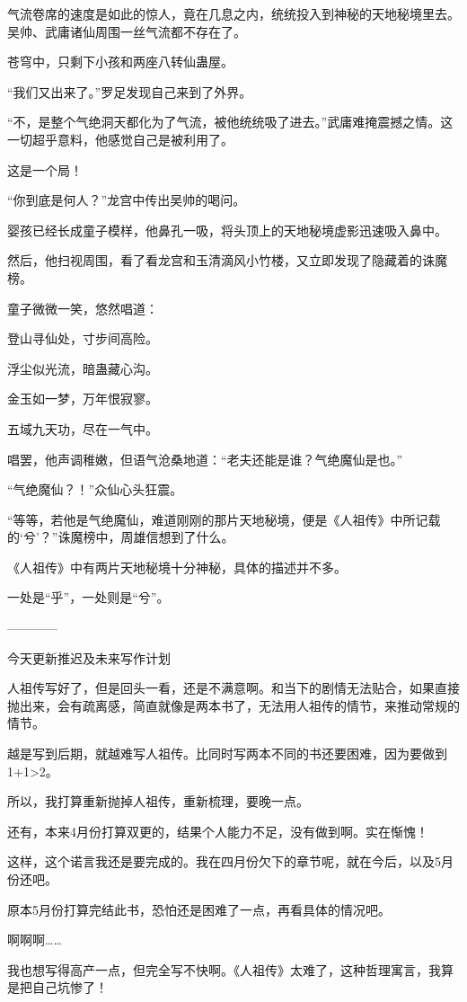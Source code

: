 \begin{this_body}
气流卷席的速度是如此的惊人，竟在几息之内，统统投入到神秘的天地秘境里去。吴帅、武庸诸仙周围一丝气流都不存在了。

苍穹中，只剩下小孩和两座八转仙蛊屋。

“我们又出来了。”罗足发现自己来到了外界。

“不，是整个气绝洞天都化为了气流，被他统统吸了进去。”武庸难掩震撼之情。这一切超乎意料，他感觉自己是被利用了。

这是一个局！

“你到底是何人？”龙宫中传出吴帅的喝问。

婴孩已经长成童子模样，他鼻孔一吸，将头顶上的天地秘境虚影迅速吸入鼻中。

然后，他扫视周围，看了看龙宫和玉清滴风小竹楼，又立即发现了隐藏着的诛魔榜。

童子微微一笑，悠然唱道：

登山寻仙处，寸步间高险。

浮尘似光流，暗蛊藏心沟。

金玉如一梦，万年恨寂寥。

五域九天功，尽在一气中。

唱罢，他声调稚嫩，但语气沧桑地道：“老夫还能是谁？气绝魔仙是也。”

“气绝魔仙？！”众仙心头狂震。

“等等，若他是气绝魔仙，难道刚刚的那片天地秘境，便是《人祖传》中所记载的‘兮’？”诛魔榜中，周雄信想到了什么。

《人祖传》中有两片天地秘境十分神秘，具体的描述并不多。

一处是“乎”，一处则是“兮”。

------------

今天更新推迟及未来写作计划

人祖传写好了，但是回头一看，还是不满意啊。和当下的剧情无法贴合，如果直接抛出来，会有疏离感，简直就像是两本书了，无法用人祖传的情节，来推动常规的情节。

越是写到后期，就越难写人祖传。比同时写两本不同的书还要困难，因为要做到1+1>2。

所以，我打算重新抛掉人祖传，重新梳理，要晚一点。

还有，本来4月份打算双更的，结果个人能力不足，没有做到啊。实在惭愧！

这样，这个诺言我还是要完成的。我在四月份欠下的章节呢，就在今后，以及5月份还吧。

原本5月份打算完结此书，恐怕还是困难了一点，再看具体的情况吧。

啊啊啊……

我也想写得高产一点，但完全写不快啊。《人祖传》太难了，这种哲理寓言，我算是把自己坑惨了！

\end{this_body}


